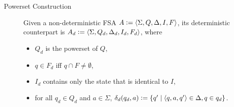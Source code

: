 \begin{description}
    \item[Powerset Construction] 
        Given a non-deterministic FSA $A \mathrel{\mathop:}= \left \langle \Sigma, Q, \Delta, I, F \right \rangle $, its deterministic counterpart is $A_d \mathrel{\mathop:}= \left \langle \Sigma, Q_d, \Delta_d, I_d, F_d \right \rangle $, where
        \begin{itemize}
            \item $Q_d$ is the powerset of $Q$,
            \item $q \in F_d$ iff $q \cap F \neq \emptyset$,
            \item $I_d$ contains only the state that is identical to $I$,
            \item for all $q_d \in Q_d$ and $a \in \Sigma$, $\delta_d(q_d,a) \mathrel{\mathop:}= \left \{  q' \mid \left \langle q,a,q' \right \rangle  \in \Delta, q \in q_d \right \}$.
        \end{itemize}
%
\end{description}
%
